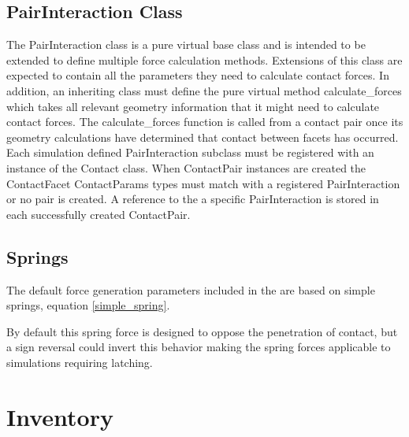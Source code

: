 \subsection{PairInteraction Class}
The PairInteraction class is a pure virtual base class and is intended to be extended to define multiple force calculation methods.  Extensions of this class are expected to contain all the parameters they need to calculate contact forces.  In addition, an inheriting class must define the pure virtual method calculate\_forces which takes all relevant geometry information that it might need to calculate contact forces.  The calculate\_forces function is called from a contact pair once its geometry calculations have determined that contact between facets has occurred. Each simulation defined PairInteraction subclass must be registered with an instance of the Contact class. When ContactPair instances are created the ContactFacet ContactParams types must match with a registered PairInteraction or no pair is created. A reference to the a specific PairInteraction is stored in each successfully created ContactPair.

\subsection{Springs}
The default force generation parameters included in the \ModelDesc are based on simple springs, equation \ref{simple_spring}.

By default this spring force is designed to oppose the penetration of contact, but a sign reversal could invert this behavior making the spring forces applicable to simulations requiring latching.

\section{Inventory}

